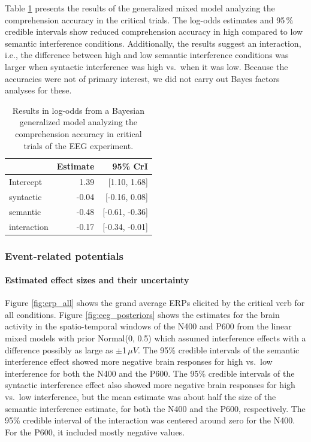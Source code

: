 \documentclass[review,preprint,12pt,authoryear,floatsintext]{elsarticle}
\begin{document}
Table \ref{tab:eeg_acc_mod} presents the results of the generalized mixed model analyzing the comprehension accuracy in the critical trials. The log-odds estimates and 95\,\% credible intervals show reduced comprehension accuracy in high compared to low semantic interference conditions. Additionally, the results suggest an interaction, i.e., the difference between high and low semantic interference conditions was larger when syntactic interference was high vs.\ when it was low. Because the accuracies were not of primary interest, we did not carry out Bayes factors analyses for these.

\begin{table}[ht]
    \caption{Results in log-odds from a Bayesian generalized model analyzing the comprehension accuracy in critical trials of the EEG experiment.}
    \label{tab:eeg_acc_mod}
    \centering
    \begin{tabular}{lrr}
    \toprule
    & Estimate &  95\% CrI  \\
    \midrule
Intercept& 1.39 &   [1.10, 1.68]\\
syntactic& -0.04 &  [-0.16, 0.08]\\
semantic&  -0.48 & [-0.61, -0.36]\\
interaction& -0.17&  [-0.34, -0.01]\\
    \bottomrule
    \end{tabular}
\end{table}

\subsubsection{Event-related potentials}

\paragraph{Estimated effect sizes and their uncertainty}

Figure \ref{fig:erp_all} shows the 
grand average ERPs elicited by the critical verb for all conditions. Figure \ref{fig:eeg_posteriors} shows the estimates for the brain activity in the spatio-temporal windows of the N400 and P600 from the linear mixed models with prior Normal(0, 0.5) which assumed interference effects with a difference possibly as large as $\pm$1\,$\mu V$. {The 95\% credible intervals of the semantic interference effect showed more negative brain responses for high vs.\ low interference for both the N400 and the P600. The 95\% credible intervals of the syntactic interference effect also showed more negative brain responses for high vs.\ low interference, but the mean estimate was about half the size of the semantic interference estimate, for both the N400 and the P600, respectively. The 95\% credible interval of the interaction was centered around zero for the N400. For the P600, it included mostly negative values.}\label{ERP_results1}
\end{document}
